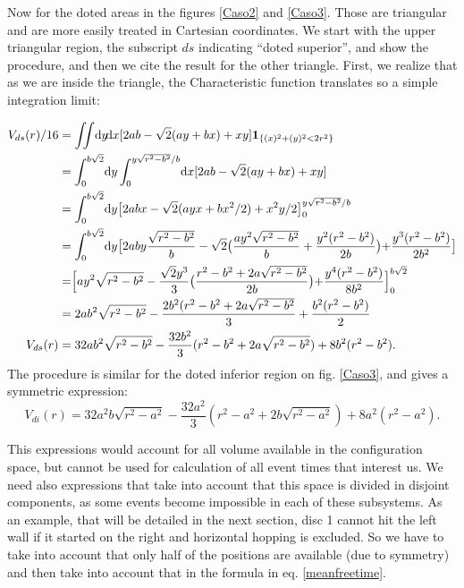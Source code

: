 \documentclass[letterpaper,10pt, jcp, aps]{revtex4-1}
\newcommand{\rd}{\!\mathrm{d}}
\newcommand{\indicator}[1]{\mathbf{1}_{ \{   #1 \} } }
\begin{document}
Now for the doted areas in the figures \ref{Caso2} and \ref{Caso3}. Those are triangular
and are more easily treated in Cartesian coordinates. We start with the upper
triangular region, the subscript $ds$ indicating ``doted superior'',
and show the procedure, and then we cite the result for the
other triangle.
First, we realize that as we are inside the triangle, the Characteristic function
translates so a simple integration limit:

\begin{equation}
  \begin{split}
    V_{ds}(r) /16 &=\iint \rd y \rd x [2ab-\sqrt{2}(ay+bx)+xy] \indicator{(x)^2+(y)^2<2r^2 }\\
    &=\int_0^{b\sqrt{2}}\rd y \int_{0}^{y\sqrt{r^2-b^2}/b} \rd x [2ab-\sqrt{2}(ay+bx)+xy] \\
   &=\int_0^{b\sqrt{2}}\rd y \bigl[2abx-\sqrt{2}(ayx+bx^2/2)+x^2y/2\bigr]_{0}^{y\sqrt{r^2-b^2}/b} \\
      &=\int_0^{b\sqrt{2}}\rd y
        \bigr[
          2aby\frac{\sqrt{r^2-b^2}}{b}
          -\sqrt{2}
          \bigr(
          \frac{ay^2\sqrt{r^2-b^2}}{b}
            +\frac{y^2(r^2-b^2)}{2b}
            \bigl)
           +\frac{y^3(r^2-b^2)}{2b^2}
           \bigl]\\
        &= \Bigr[ay^2\sqrt{r^2-b^2}-
          \frac{\sqrt{2}y^3}{3}
          \bigr(
          \frac{r^2-b^2+2a\sqrt{r^2-b^2}}{2b}
            \bigl)
            +\frac{y^4(r^2-b^2)}{8b^2}
            \Bigl]_0^{b\sqrt{2}}\\
          &=2ab^2\sqrt{r^2-b^2}
          -\frac{2b^2(r^2-b^2+2a\sqrt{r^2-b^2}}{3}+\frac{b^2(r^2-b^2)}{2}\\
          V_{ds}(r)&=32ab^2\sqrt{r^2-b^2} -\frac{32
            b^2}{3}(r^2-b^2+2a\sqrt{r^2-b^2}) +8b^2(r^2-b^2).
  \end{split}
  \end{equation}
The procedure is similar for the doted inferior region on fig. \ref{Caso3},
and gives a symmetric expression:
\begin{equation}
          V_{di}(r)=32a^2b\sqrt{r^2-a^2} -\frac{32
            a^2}{3}(r^2-a^2+2b\sqrt{r^2-a^2}) +8a^2(r^2-a^2).
\end{equation}

This expressions would account for all volume available in the configuration space, but
cannot be used for calculation of all event times that interest us. We need also
expressions that take into account that this space is divided in disjoint components,
as some events become impossible in each of these subsystems. As an example,
that will be detailed in the next section, disc 1 cannot hit the left wall if
it started on the right and horizontal hopping is excluded. So we have to
take into account that only half of the positions are available (due to symmetry)
and then take into account that in the formula in eq. \ref{meanfreetime}.
\end{document}
